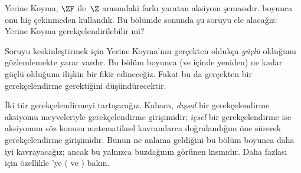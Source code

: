 \documentclass[../../../include/open-logic-section]{subfiles}
\begin{document}

Yerine Koyma, $\ZF$ ile~$\Z$ arasındaki farkı yaratan aksiyom şemasıdır.
 boyunca onu hiç çekinmeden
kullandık. Bu bölümde sonunda şu soruyu ele alacağız: Yerine Koyma
gerekçelendirilebilir mi?

Soruyu keskinleştirmek için Yerine Koyma'nın gerçekten oldukça
\emph{güçlü} olduğunu gözlemlemekte yarar vardır. Bu bölüm boyunca (ve
 içinde yeniden) ne kadar güçlü
olduğuna ilişkin bir fikir edineceğiz. Fakat bu da gerçekten bir
gerekçelendirme gerektiğini düşündürecektir.

İki tür gerekçelendirmeyi tartışacağız. Kabaca, \emph{dışsal} bir
gerekçelendirme aksiyomu meyveleriyle gerekçelendirme girişimidir;
\emph{içsel} bir gerekçelendirme ise aksiyomun söz konusu matematiksel
kavramlarca doğrulandığını öne sürerek gerekçelendirme girişimidir. Bunun ne
anlama geldiğini bu bölüm boyunca daha iyi kavrayacağız; ancak bu yalnızca
buzdağının görünen kısmıdır. Daha fazlası için özellikle
\citeauthor{Maddy1988a}'ye (\citeyear{Maddy1988a} ve
\citeyear{Maddy1988b}) bakın.
\end{document}
